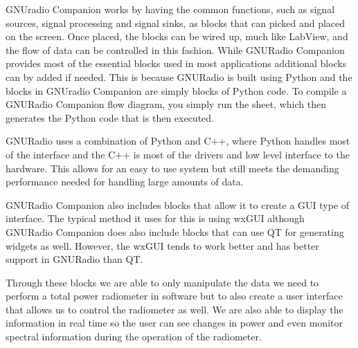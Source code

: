 GNUradio Companion works by having the common functions, such as signal sources, signal processing and signal sinks, as blocks that can picked and placed on the screen.  Once placed, the blocks can be wired up, much like LabView, and the flow of data can be controlled in this fashion.  While GNURadio Companion provides most of the essential blocks used in most applications additional blocks can by added if needed.  This is because GNURadio is built using Python and the blocks in GNUradio Companion are simply blocks of Python code.  To compile a GNURadio Companion flow diagram, you simply run the sheet, which then generates the Python code that is then executed.  

GNURadio uses a combination of Python and C++, where Python handles most of the interface and the C++ is most of the drivers and low level interface to the hardware.  This allows for an easy to use system but still meets the demanding performance needed for handling large amounts of data.  

GNURadio Companion also includes blocks that allow it to create a GUI type of interface.  The typical method it uses for this is using wxGUI although GNURadio Companion does also include blocks that can use QT for generating widgets as well.  However, the wxGUI tends to work better and has better support in GNURadio than QT.  

Through these blocks we are able to only manipulate the data we need to perform a total power radiometer in software but to also create a user interface that allows us to control the radiometer as well.  We are also able to display the information in real time so the user can see changes in power and even monitor spectral information during the operation of the radiometer. 


